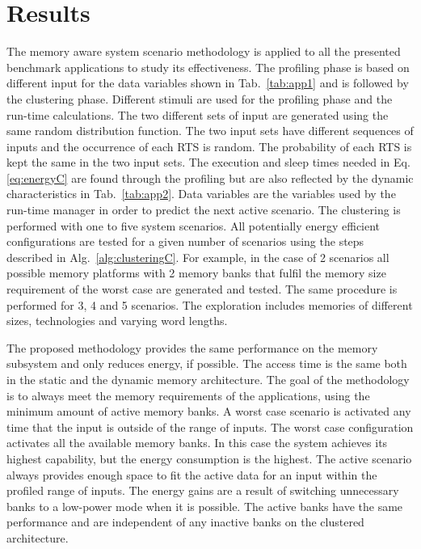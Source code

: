 \section{Results}
\label{sec:resultsC}

The memory aware system scenario methodology is applied to all the presented benchmark applications to study its effectiveness. 
The profiling phase is based on different input for the data variables shown in Tab.~\ref{tab:app1} and is followed by the clustering phase. 
Different stimuli are used for the profiling phase and the run-time calculations. 
The two different sets of input are generated using the same random distribution function. 
The two input sets have different sequences of inputs and the occurrence of each RTS is random. 
The probability of each RTS is kept the same in the two input sets.
The execution and sleep times needed in Eq.\ref{eq:energyC} are found through the profiling but are also reflected by the dynamic characteristics in Tab.~\ref{tab:app2}. 
Data variables are the variables used by the run-time manager in order to predict the next active scenario. 
The clustering is performed with one to five system scenarios. 
All potentially energy efficient configurations are tested for a given number of scenarios using the steps described in Alg.~\ref{alg:clusteringC}. 
For example, in the case of 2 scenarios all possible memory platforms with 2 memory banks that fulfil the memory size requirement of the worst case are generated and tested. 
The same procedure is performed for 3, 4 and 5 scenarios. 
The exploration includes memories of different sizes, technologies and varying word lengths. 

The proposed methodology provides the same performance on the memory subsystem and only reduces energy, if possible. 
The access time is the same both in the static and the dynamic memory architecture. 
The goal of the methodology is to always meet the memory requirements of the applications, using the minimum amount of active memory banks.
A worst case scenario is activated any time that the input is outside of the range of inputs. 
The worst case configuration activates all the available memory banks. 
In this case the system achieves its highest capability, but the energy consumption is the highest.
The active scenario always provides enough space to fit the active data for an input within the profiled range of inputs. 
The energy gains are a result of switching unnecessary banks to a low-power mode when it is possible. 
The active banks have the same performance and are independent of any inactive banks on the clustered architecture.

